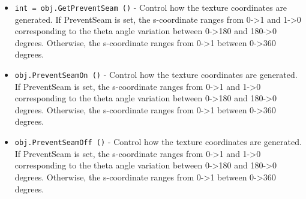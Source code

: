 \begin{itemize}
\item  \verb|int = obj.GetPreventSeam ()| -  Control how the texture coordinates are generated. If PreventSeam is
 set, the s-coordinate ranges from 0->1 and 1->0 corresponding to the
 theta angle variation between 0->180 and 180->0 degrees. Otherwise, the
 s-coordinate ranges from 0->1 between 0->360 degrees.

\item  \verb|obj.PreventSeamOn ()| -  Control how the texture coordinates are generated. If PreventSeam is
 set, the s-coordinate ranges from 0->1 and 1->0 corresponding to the
 theta angle variation between 0->180 and 180->0 degrees. Otherwise, the
 s-coordinate ranges from 0->1 between 0->360 degrees.

\item  \verb|obj.PreventSeamOff ()| -  Control how the texture coordinates are generated. If PreventSeam is
 set, the s-coordinate ranges from 0->1 and 1->0 corresponding to the
 theta angle variation between 0->180 and 180->0 degrees. Otherwise, the
 s-coordinate ranges from 0->1 between 0->360 degrees.

\end{itemize}
